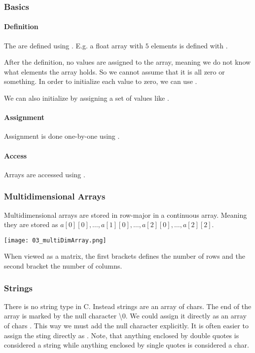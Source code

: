 \subsubsection{Basics}
\paragraph{Definition}
The are defined using . E.g. a float array with $5$ elements is defined with .

After the definition, no values are assigned to the array, meaning we do not know what elements the array holds. So we cannot assume that it is all zero or something. In order to initialize each value to zero, we can use .

We can also initialize by assigning a set of values like .

\paragraph{Assignment}
Assignment is done one-by-one using .

\paragraph{Access}
Arrays are accessed using .

\subsubsection{Multidimensional Arrays}
Multidimensional arrays are stored in row-major in a continuous array. Meaning they are stored as $a[0][0], \dots, a[1][0], \dots, a[2][0], \dots, a[2][2]$.

\texttt{[image: 03\_multiDimArray.png]}

When viewed as a matrix, the first brackets defines the number of rows and the second bracket the number of columns.

\subsubsection{Strings}
There is no string type in C. Instead strings are an array of chars. The end of the array is marked by the null character \textbackslash 0. We could assign it directly as an array of chars . This way we must add the null character explicitly. It is often easier to assign the sting directly as . Note, that anything enclosed by double quotes is considered a string while anything enclosed by single quotes is considered a char.

